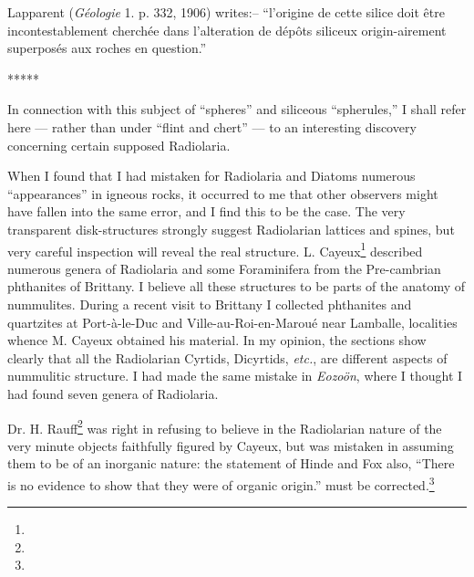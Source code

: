 \documentclass[a4paper, 12pt, oneside]{article}
\begin{document}
Lapparent (\emph{Géologie} 1. p. 332, 1906) writes:-- ``l'origine de cette silice doit être incontestablement cherchée dans l'alteration de dépôts siliceux origin-airement superposés aux roches en question.''

\centerline{*\hspace{15mm}*\hspace{15mm}*\hspace{15mm}*\hspace{15mm}*}
\bigskip

In connection with this subject of ``spheres'' and siliceous ``spherules,'' I shall refer here --- rather than under ``flint and chert'' --- to an interesting discovery concerning certain supposed Radiolaria.

When I found that I had mistaken for Radiolaria and Diatoms numerous ``appearances'' in igneous rocks, it occurred to me that other observers might have fallen into the same error, and I find this to be the case. The very transparent disk-structures strongly suggest Radiolarian lattices and spines, but very careful inspection will reveal the real structure. L. Cayeux\footnote{} described numerous genera of Radiolaria and some Foraminifera from the Pre-cambrian phthanites of Brittany. I believe all these structures to be parts of the anatomy of nummulites. During a recent visit to Brittany I collected phthanites and quartzites at Port-à-le-Duc and Ville-au-Roi-en-Maroué near Lamballe, localities whence M. Cayeux obtained his material. In my opinion, the sections show clearly that all the Radiolarian Cyrtids, Dicyrtids, \emph{etc.}, are different aspects of nummulitic structure. I had made the same mistake in \emph{Eozoön}, where I thought I had found seven genera of Radiolaria.

Dr. H. Rauff\footnote{} was right in refusing to believe in the Radiolarian nature of the very minute objects faithfully figured by Cayeux, but was mistaken in assuming them to be of an inorganic nature: the statement of Hinde and Fox also, ``There is no evidence to show that they were of organic origin.'' must be corrected.\footnote{}
\end{document}
